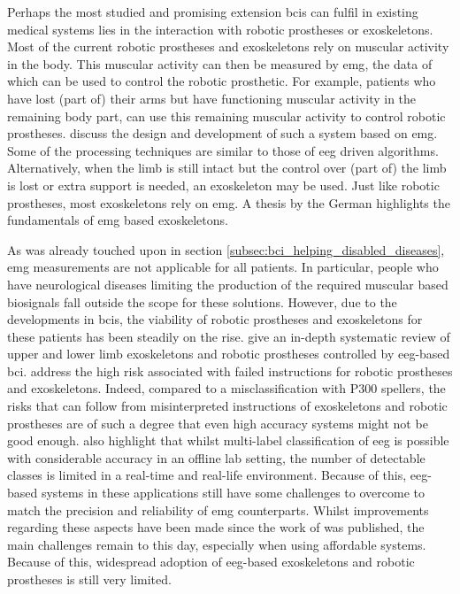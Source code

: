 
Perhaps the most studied and promising extension \glspl{bci} can fulfil in existing medical systems lies in the interaction with robotic prostheses or exoskeletons.
Most of the current robotic prostheses and exoskeletons rely on muscular activity in the body.
This muscular activity can then be measured by \gls{emg}, the data of which can be used to control the robotic prosthetic.
For example, patients who have lost (part of) their arms but have functioning muscular activity in the remaining body part, can use this remaining muscular activity to control robotic prostheses.
 discuss the design and development of such a system based on \gls{emg}.
Some of the processing techniques are similar to those of \gls{eeg} driven algorithms.
Alternatively, when the limb is still intact but the control over (part of) the limb is lost or extra support is needed, an exoskeleton may be used.
Just like robotic prostheses, most exoskeletons rely on \gls{emg}.
A thesis by the German \citet{emg_exoskeleton} highlights the fundamentals of \gls{emg} based exoskeletons.

As was already touched upon in section \ref{subsec:bci_helping_disabled_diseases}, \gls{emg} measurements are not applicable for all patients.
In particular, people who have neurological diseases limiting the production of the required muscular based \glspl{biosignal} fall outside the scope for these solutions.
However, due to the developments in \glspl{bci}, the viability of robotic prostheses and exoskeletons for these patients has been steadily on the rise.
 give an in-depth systematic review of upper and lower limb exoskeletons and robotic prostheses controlled by \gls{eeg}-based \gls{bci}.
 address the high risk associated with failed instructions for robotic prostheses and exoskeletons.
Indeed, compared to a misclassification with P300 spellers, the risks that can follow from misinterpreted instructions of exoskeletons and robotic prostheses are of such a degree that even high accuracy systems might not be good enough.
 also highlight that whilst multi-label classification of \gls{eeg} is possible with considerable accuracy in an offline lab setting, the number of detectable classes is limited in a real-time and real-life environment.
Because of this, \gls{eeg}-based systems in these applications still have some challenges to overcome to match the precision and reliability of \gls{emg} counterparts.
Whilst improvements regarding these aspects have been made since the work of \citet{bci_prostheses} was published, the main challenges remain to this day, especially when using affordable systems.
Because of this, widespread adoption of \gls{eeg}-based exoskeletons and robotic prostheses is still very limited.

